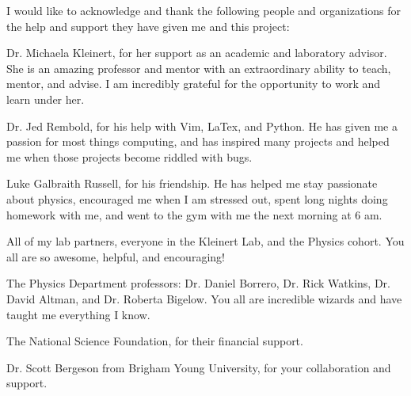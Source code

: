 \documentclass[12pt]{report}
\begin{document}
\begin{acknowledgments}
I would like to acknowledge and thank the following people and organizations for the help and support they have given me and this project:

\begin{description}
   \item Dr. Michaela Kleinert, for her support as an academic and laboratory advisor. She is an amazing professor and mentor with an extraordinary ability to teach, mentor, and advise. I am incredibly grateful for the opportunity to work and learn under her.
   \item Dr. Jed Rembold, for his help with Vim, LaTex, and Python. He has given me a passion for most things computing, and has inspired many projects and helped me when those projects become riddled with bugs. 
   \item Luke Galbraith Russell, for his friendship. He has helped me stay passionate about physics, encouraged me when I am stressed out, spent long nights doing homework with me, and went to the gym with me the next morning at 6 am. 
   \item All of my lab partners, everyone in the Kleinert Lab, and the Physics cohort. You all are so awesome, helpful, and encouraging!
   \item The Physics Department professors: Dr. Daniel Borrero, Dr. Rick Watkins, Dr. David Altman, and Dr. Roberta Bigelow. You all are incredible wizards and have taught me everything I know.
   \item The National Science Foundation, for their financial support.
   \item Dr. Scott Bergeson from Brigham Young University, for your collaboration and support.
\end{description}


\end{acknowledgments}







\tableofcontents
\listoffigures

\pagebreak



\end{document}
